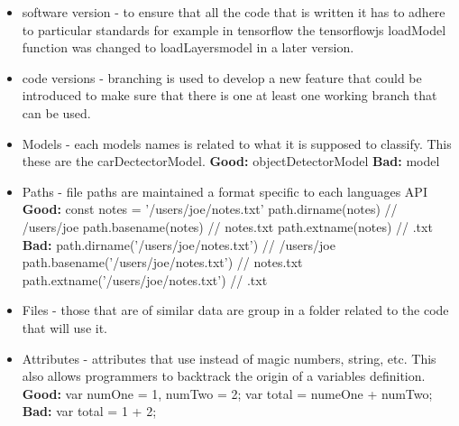 \documentclass[10pt]{article}
\begin{document}
\begin{itemize}
	        
	        \item software version -  to ensure that all the code that is written it has to adhere to particular standards for example in tensorflow the tensorflowjs loadModel function was changed to loadLayersmodel in a later version.
	        \newline
	        
	        
	        \item code versions - branching is used to develop a new feature that could be introduced to make sure that there is one at least one working branch that can be used.
	        
	        \item Models - each models names is related to what it is supposed to classify. This these are the carDectectorModel.
	        \newline
	        \textbf{Good: } objectDetectorModel
	        \newline \textbf{Bad:} model
	        \newline 
	        
	        \item Paths - file paths are maintained a format specific to each languages API
	        \newline
	        \textbf{Good:} const notes = '/users/joe/notes.txt'
            \newline path.dirname(notes) // /users/joe
            \newline path.basename(notes) // notes.txt
            \newline path.extname(notes) // .txt
	        \newline \textbf{Bad:}
            \newline path.dirname('/users/joe/notes.txt') // /users/joe
            \newline path.basename('/users/joe/notes.txt') // notes.txt
            \newline path.extname('/users/joe/notes.txt') // .txt
	        
	        \item Files - those that are of similar data are group in a folder related to the code that will use it.
	        \newline
	        
	        \item Attributes - attributes that use instead of magic numbers, string, etc. This also allows programmers to backtrack the origin of a variables definition.
	        \newline
	        \textbf{Good:} 
	        \newline var numOne = 1, numTwo = 2;
	        \newline var total = numeOne + numTwo;
	        \newline \textbf{Bad:}
	        \newline var total = 1 + 2;
	        

\end{itemize}
\end{document}
